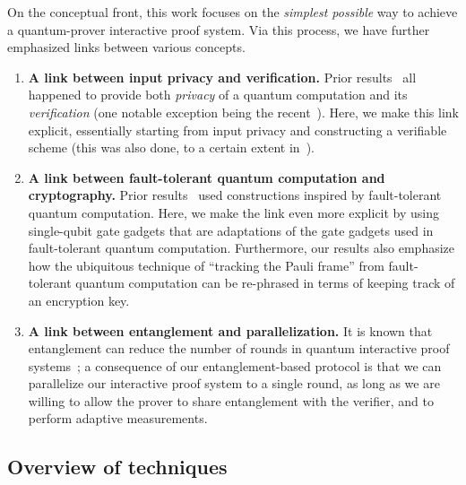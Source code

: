 \documentclass{toc}
\begin{document}
On the conceptual front, this work  focuses on the \emph{simplest possible} way to achieve a quantum-prover interactive proof system.
Via this process, we have
further emphasized  links between various
concepts. %
\begin{enumerate}
\item \textbf{A link between input privacy and verification.} Prior results~\cite{ABE10, BFK09, BGS13, FK12} all happened to provide both \emph{privacy} of a quantum computation and its \emph{verification} (one notable exception being the recent~\cite{FH15}). Here, we make this link explicit, essentially starting from input privacy and constructing a verifiable scheme (this was also done, to a certain extent in~\cite{BFK09, FK12}).

    \item \textbf{A link between fault-tolerant quantum computation and cryptography.} Prior results~\cite{BCG+06, ABE10, BGS13} used constructions inspired by fault-tolerant quantum computation. Here, we make the link even more explicit by using single-qubit gate gadgets that are adaptations of the gate gadgets used in fault-tolerant quantum computation.  Furthermore, our results also emphasize how the ubiquitous technique of  ``tracking the Pauli frame'' from fault-tolerant quantum computation can be re-phrased in terms of keeping track of an encryption key.


\item \textbf{A link between entanglement and parallelization.} It is known that entanglement can reduce the number of rounds in quantum interactive proof systems~\cite{KKMV08}; a consequence of our entanglement-based protocol is that we can parallelize our interactive proof system to a single round, as long as we are willing to allow the prover to share entanglement with the verifier, and to perform adaptive measurements.
\end{enumerate}








\subsection{Overview of techniques}
\label{sec:overview-techniques}
\end{document}
